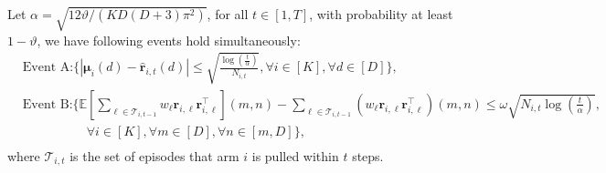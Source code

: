 \begin{proposition}
\label{proposition: uniform_confidence_bound}
Let $\alpha = \sqrt{12 \vartheta/(KD(D+3) \pi^2)}$, for all $t\in [1,T]$, with probability at least $1 - \vartheta$, we have following events hold simultaneously:
\[
\begin{aligned}
& \text{Event A:} \Bigg\{ |\boldsymbol{\mu}_{i}(d) - \boldsymbol{\hat{r}}_{i,t}(d)| \leq \sqrt{\frac{\log \left( \frac{t}{\alpha} \right)}{N_{i,t}}}, \forall i \in [K], \forall d \in [D] \Bigg\}, \\
& \text{Event B:} \Bigg\{ \mathbb{E} \left[ \sum_{\ell \in \mathcal{T}_{i,t-1}} w_{\ell} \boldsymbol{r}_{i,\ell} \boldsymbol{r}_{i,\ell}^{\top} \right](m,n)
-
\sum_{\ell \in \mathcal{T}_{i,t-1}} \left( w_{\ell} \boldsymbol{r}_{i,\ell} \boldsymbol{r}_{i,\ell}^{\top} \right)(m,n)
\leq 
\omega \sqrt{ N_{i,t} \log \left( \frac{t}{\alpha} \right)}, \\ 
& \qquad \qquad \quad \forall i \in [K], \forall m \in [D], \forall n \in [m,D] \Bigg\}, \\
\end{aligned}
\]
where $\mathcal{T}_{i,t}$ is the set of episodes that arm $i$ is pulled within $t$ steps.
\end{proposition}


